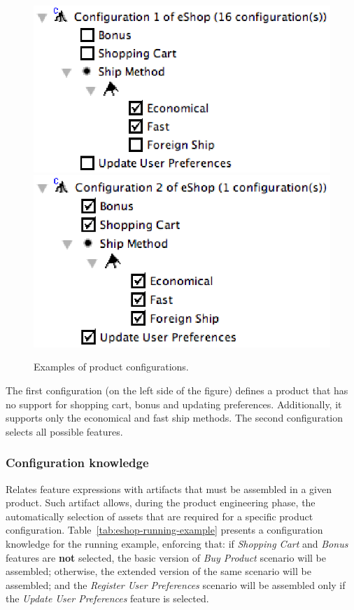 \documentclass{acm_proc_article-sp}
\begin{document}
\begin{figure}[h]
  \centerline{
    \mbox{\includegraphics[scale=0.4]{img/pc-01.eps}}
    \mbox{\includegraphics[scale=0.4]{img/pc-02.eps}}
  }
  \caption{Examples of product configurations.}
  \label{fig:product-config-01-02}
  \end{figure}
  
The first configuration (on the left side of the figure) defines a
product that has no support for shopping cart, bonus and updating preferences. Additionally, it supports only the economical and fast 
ship methods. The second configuration selects all possible features.  

\subsubsection{Configuration knowledge} 

Relates feature expressions with artifacts that must be assembled in a given product. Such artifact allows, during the product engineering phase, the automatically selection of assets that are required for a specific product configuration. Table~\ref{tab:eshop-running-example} presents a configuration knowledge 
for the running example, enforcing that: if \emph{Shopping Cart} and \emph{Bonus} features are {\bf not} selected, the 
basic version of \emph{Buy Product} scenario will be assembled; otherwise, the extended version of the same 
scenario will be assembled; and the \emph{Register User Preferences} scenario will be assembled only if the \emph{Update 
User Preferences} feature is selected.
\end{document}
